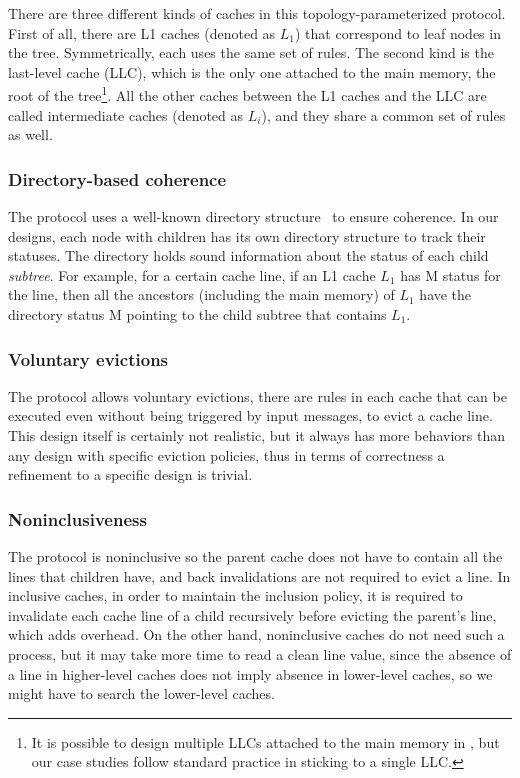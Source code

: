 \documentclass[sigplan,10pt,review,anonymous,screen]{acmart}\settopmatter{printfolios=true,printccs=false,printacmref=false}
\begin{document}
There are three different kinds of caches in this topology-parameterized protocol.
First of all, there are L1 caches (denoted as $L_1$) that correspond to leaf nodes in the tree.
Symmetrically, each uses the same set of rules.
The second kind is the last-level cache (LLC), which is the only one attached to the main memory, the root of the tree\footnote{It is possible to design multiple LLCs attached to the main memory in \hemiola{}, but our case studies follow standard practice in sticking to a single LLC.}.
All the other caches between the L1 caches and the LLC are called intermediate caches (denoted as $L_i$), and they share a common set of rules as well.

\subsubsection{Directory-based coherence}

The protocol uses a well-known directory structure~\cite{Tang:1976} to ensure coherence.
In our designs, each node with children has its own directory structure to track their statuses.
The directory holds sound information about the status of each child \emph{subtree}.
For example, for a certain cache line, if an L1 cache $L_1$ has M status for the line, then all the ancestors (including the main memory) of $L_1$ have the directory status M pointing to the child subtree that contains $L_1$.

\subsubsection{Voluntary evictions}

The protocol allows voluntary evictions, \ie{} there are rules in each cache that can be executed even without being triggered by input messages, to evict a cache line.
This design itself is certainly not realistic, but it always has more behaviors than any design with specific eviction policies, thus in terms of correctness a refinement to a specific design is trivial.

\subsubsection{Noninclusiveness}

The protocol is noninclusive so the parent cache does not have to contain all the lines that children have, and back invalidations are not required to evict a line.
In inclusive caches, in order to maintain the inclusion policy, it is required to invalidate each cache line of a child recursively before evicting the parent's line, which adds overhead.
On the other hand, noninclusive caches do not need such a process, but it may take more time to read a clean line value, since the absence of a line in higher-level caches does not imply absence in lower-level caches, so we might have to search the lower-level caches.
\end{document}
